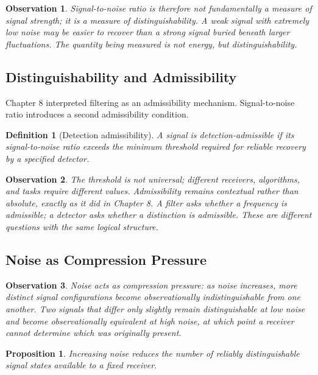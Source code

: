 \documentclass[12pt]{article}
\newtheorem{definition}{Definition}
\newtheorem{proposition}{Proposition}
\newtheorem{observation}{Observation}
\begin{document}
\begin{observation}
Signal-to-noise ratio is therefore not fundamentally a measure of signal strength; it is a measure of distinguishability. A weak signal with extremely low noise may be easier to recover than a strong signal buried beneath larger fluctuations. The quantity being measured is not energy, but distinguishability.
\end{observation}

\subsection{Distinguishability and Admissibility}

Chapter 8 interpreted filtering as an admissibility mechanism. Signal-to-noise ratio introduces a second admissibility condition.

\begin{definition}[Detection admissibility]
A signal is detection-admissible if its signal-to-noise ratio exceeds the minimum threshold required for reliable recovery by a specified detector.
\end{definition}

\begin{observation}
The threshold is not universal; different receivers, algorithms, and tasks require different values. Admissibility remains contextual rather than absolute, exactly as it did in Chapter 8. A filter asks whether a frequency is admissible; a detector asks whether a distinction is admissible. These are different questions with the same logical structure.
\end{observation}

\subsection{Noise as Compression Pressure}

\begin{observation}
Noise acts as compression pressure: as noise increases, more distinct signal configurations become observationally indistinguishable from one another. Two signals that differ only slightly remain distinguishable at low noise and become observationally equivalent at high noise, at which point a receiver cannot determine which was originally present.
\end{observation}

\begin{proposition}
Increasing noise reduces the number of reliably distinguishable signal states available to a fixed receiver.
\end{proposition}
\end{document}

